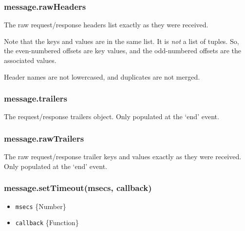 \subsubsection{message.rawHeaders}\label{message.rawheaders}

The raw request/response headers list exactly as they were received.

Note that the keys and values are in the same list. It is \emph{not} a
list of tuples. So, the even-numbered offsets are key values, and the
odd-numbered offsets are the associated values.

Header names are not lowercased, and duplicates are not merged.

\begin{Shaded}
\begin{Highlighting}[]
\CommentTok{//}
\CommentTok{// [ 'user-agent',}
\CommentTok{//   '*/*' ]}
\NormalTok{(}\NormalTok{);}
\end{Highlighting}
\end{Shaded}

\subsubsection{message.trailers}\label{message.trailers}

The request/response trailers object. Only populated at the `end' event.

\subsubsection{message.rawTrailers}\label{message.rawtrailers}

The raw request/response trailer keys and values exactly as they were
received. Only populated at the `end' event.

\subsubsection{message.setTimeout(msecs,
callback)}\label{message.settimeoutmsecs-callback}

\begin{itemize}
\itemsep1pt\parskip0pt
\item
  \texttt{msecs} \{Number\}
\item
  \texttt{callback} \{Function\}
\end{itemize}

